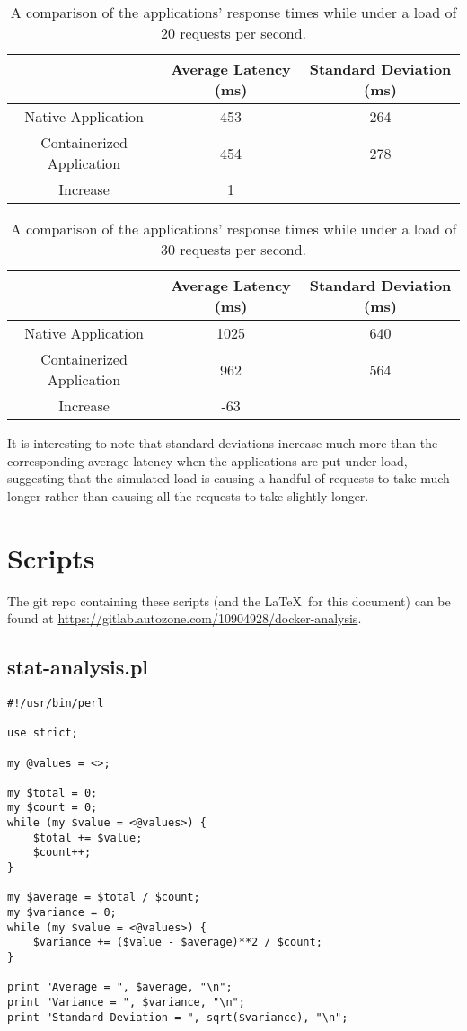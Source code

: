 \documentclass{article}
\begin{document}
\begin{table}[H]
\begin{tabular}{ |c|c|c| }
 \hline
 & Average Latency (ms) & Standard Deviation (ms) \\
 \hline
 Native Application & 453 & 264 \\
 \hline
 Containerized Application & 454 & 278 \\
 \hline\hline
 Increase & 1 & \\
 \hline
\end{tabular}
\caption{A comparison of the applications' response times while under a load of 20 requests per second.}
\label{latency-under-load-20}
\end{table}

\begin{table}[H]
\begin{tabular}{ |c|c|c| }
 \hline
 & Average Latency (ms) & Standard Deviation (ms) \\
 \hline
 Native Application & 1025 & 640 \\
 \hline
 Containerized Application & 962 & 564 \\
 \hline\hline
 Increase & -63 & \\
 \hline
\end{tabular}
\caption{A comparison of the applications' response times while under a load of 30 requests per second.}
\label{latency-under-load-30}
\end{table}

It is interesting to note that standard deviations increase much more than the corresponding average latency when the applications are put under load, suggesting that the simulated load is causing a handful of requests to take much longer rather than causing all the requests to take slightly longer.

\section{Scripts}
The git repo containing these scripts (and the \LaTeX\ for this document) can be found at \href{https://gitlab.autozone.com/10904928/docker-analysis}{https://gitlab.autozone.com/10904928/docker-analysis}.

\subsection{stat-analysis.pl}
\begin{verbatim}
#!/usr/bin/perl

use strict;

my @values = <>;

my $total = 0;
my $count = 0;
while (my $value = <@values>) {
    $total += $value;
    $count++;
}

my $average = $total / $count;
my $variance = 0;
while (my $value = <@values>) {
    $variance += ($value - $average)**2 / $count;
}

print "Average = ", $average, "\n";
print "Variance = ", $variance, "\n";
print "Standard Deviation = ", sqrt($variance), "\n";
\end{verbatim}
\end{document}
